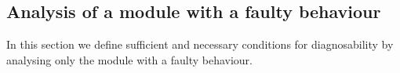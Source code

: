 \documentclass[a4paper, 10pt, conference]{ieeeconf}
\begin{document}
% 
% 
% 


\subsection{Analysis of a module with a faulty behaviour}
In this section we define sufficient and necessary conditions for diagnosability
by analysing only the module with a faulty behaviour.
\end{document}
